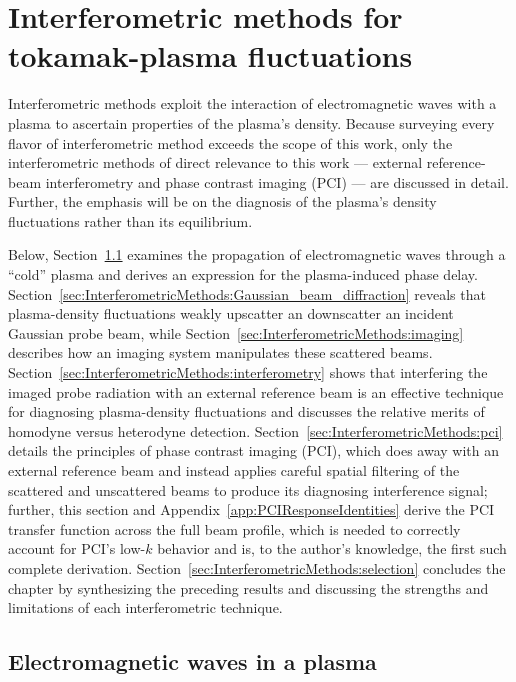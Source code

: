 \chapter{Interferometric methods for tokamak-plasma fluctuations}
Interferometric methods exploit the interaction of
electromagnetic waves with a plasma
to ascertain properties of the plasma's density.
Because surveying every flavor of interferometric method
exceeds the scope of this work,
only the interferometric methods
of direct relevance to this work ---
external reference-beam interferometry and phase contrast imaging (PCI) ---
are discussed in detail.
Further, the emphasis will be on the diagnosis of
the plasma's density fluctuations rather than its equilibrium.

Below, Section~\ref{sec:InterferometricMethods:EM_waves_in_plasma}
examines the propagation of electromagnetic waves through a ``cold'' plasma
and derives an expression for the plasma-induced phase delay.
Section~\ref{sec:InterferometricMethods:Gaussian_beam_diffraction} reveals that
plasma-density fluctuations weakly upscatter an downscatter
an incident Gaussian probe beam, while
Section~\ref{sec:InterferometricMethods:imaging} describes
how an imaging system manipulates these scattered beams.
Section~\ref{sec:InterferometricMethods:interferometry} shows that
interfering the imaged probe radiation with an external reference beam
is an effective technique for diagnosing plasma-density fluctuations and
discusses the relative merits of homodyne versus heterodyne detection.
Section~\ref{sec:InterferometricMethods:pci} details the principles of
phase contrast imaging (PCI),
which does away with an external reference beam and
instead applies careful spatial filtering
of the scattered and unscattered beams
to produce its diagnosing interference signal;
further, this section and Appendix~\ref{app:PCIResponseIdentities}
derive the PCI transfer function across the full beam profile, which
is needed to correctly account for PCI's low-$k$ behavior and is,
to the author's knowledge, the first such complete derivation.
Section~\ref{sec:InterferometricMethods:selection}
concludes the chapter by synthesizing the preceding results and
discussing the strengths and limitations of each interferometric technique.


\section{Electromagnetic waves in a plasma}
\label{sec:InterferometricMethods:EM_waves_in_plasma}


